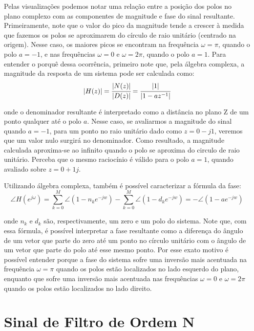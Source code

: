\documentclass[a4paper,11pt]{article}
\numberwithin{figure}{section}
\numberwithin{equation}{section}
\numberwithin{table}{section}
\theoremstyle{definition}
\begin{document}
Pelas visualizaç\~oes podemos notar uma relaç\~ao entre a posiç\~ao dos polos no plano complexo com as componentes de magnitude e fase do sinal resultante. Primeiramente, note que o valor do pico da magnitude tende a crescer \`a medida que fazemos os polos se aproximarem do c\'irculo de raio unit\'ario (centrado na origem). Nesse caso, os maiores picos se encontram na frequ\^encia $\omega = \pi$, quando o polo $a = -1$, e nas frequ\^encias $\omega = 0$ e $\omega= 2\pi$, quando o polo $a = 1$. Para entender o porqu\^e dessa ocorr\^encia, primeiro note que, pela \'algebra complexa, a magnitude da resposta de um sistema pode ser calculada como:
\begin{equation}
	| H(z) | = \cfrac{| N(z) |}{| D(z) |} = \cfrac{| 1 |}{| 1 - az^{-1} |} 
\end{equation}

\noindent onde o denominador resultante \'e interpretado como a dist\^ancia no plano Z de um ponto qualquer at\'e o polo $a$. Nesse caso, se avaliarmos a magnitude do sinal quando $a = -1$, para um ponto no raio unit\'ario dado como $z = 0-j1$, veremos que um valor nulo surgir\'a no denominador. Como resultado, a magnitude calculada aproxima-se ao infinito quando o polo se aproxima do circulo de raio unit\'ario. Perceba que o mesmo racioc\'inio \'e v\'alido para o polo $a = 1$, quando avaliado sobre $z = 0+1j$.

Utilizando \'algebra complexa, tamb\'em \'e poss\'ivel caracterizar a f\'ormula da fase:
\begin{equation}
	\angle H(e^{j\omega}) = \sum_{k=0}^M \angle (1 - n_k e^{-jw}) - \sum_{k=0}^M \angle (1 - d_k e^{-jw}) = - \angle (1 - a e^{-jw})
\end{equation}

\noindent onde $n_k$ e $d_k$ s\~ao, respectivamente, um zero e um polo do sistema. Note que, com essa f\'ormula, \'e poss\'ivel interpretar a fase resultante como a diferença do \^angulo de um vetor que parte do zero at\'e um ponto no c\'irculo unit\'ario com o \^angulo de um vetor que parte do polo at\'e esse mesmo ponto. Por esse exato motivo \'e poss\'ivel entender porque a fase do sistema sofre uma invers\~ao mais acentuada na frequ\^encia $\omega = \pi$ quando os polos est\~ao localizados no lado esquerdo do plano, enquanto que sofre uma invers\~ao mais acentuada nas frequ\^encias $\omega = 0$ e $\omega = 2\pi$ quando os polos est\~ao localizados no lado direito.


\section{Sinal de Filtro de Ordem N}
\end{document}
